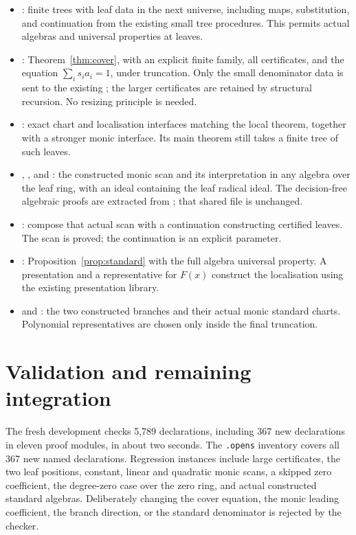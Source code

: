 \documentclass[11pt]{article}
\begin{document}
\begin{itemize}
\item {}: finite trees with leaf data in the
next universe, including maps, substitution, and continuation from the
existing small tree procedures. This permits actual algebras and
universal properties at leaves.
\item {}: Theorem~\ref{thm:cover}, with
an explicit finite family, all certificates, and the equation
$\sum_i s_i a_i=1$, under truncation. Only the small denominator data
is sent to the existing ; the larger
certificates are retained by structural recursion. No resizing
principle is needed.
\item {}: exact chart and localisation
interfaces matching the local theorem, together with a stronger monic
interface. Its main theorem still takes a finite tree of such leaves.
\item {}, , and
: the constructed monic scan and
its interpretation in any algebra over the leaf ring, with an ideal
containing the leaf radical ideal. The decision-free algebraic proofs
are extracted from ; that shared
file is unchanged.
\item {}: compose that actual scan with
a continuation constructing certified leaves. The scan is proved;
the continuation is an explicit parameter.
\item {}:
Proposition~\ref{prop:standard} with the full algebra universal
property. A presentation and a representative for $F(x)$ construct the
localisation using the existing presentation library.
\item {} and
: the two constructed branches and
their actual monic standard charts. Polynomial representatives are
chosen only inside the final truncation.
\end{itemize}

\section{Validation and remaining integration}

The fresh development checks 5,789 declarations, including 367 new
declarations in eleven proof modules, in about two seconds. The
\texttt{.opens} inventory covers all 367 new named declarations.
Regression instances include large certificates, the two leaf positions,
constant, linear and quadratic monic scans, a skipped zero coefficient,
the degree-zero case over the zero ring, and actual constructed standard
algebras. Deliberately changing the cover equation, the monic leading
coefficient, the branch direction, or the standard denominator is
rejected by the checker.
\end{document}
